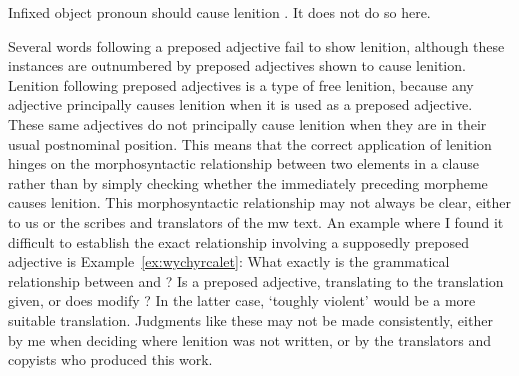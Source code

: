 Infixed object pronoun  should cause lenition . It does not do so here.

Several words following a preposed adjective fail to show lenition, although these instances are outnumbered by preposed adjectives shown to cause lenition.
Lenition following preposed adjectives is a type of free lenition, because any adjective principally causes lenition when it is used as a preposed adjective.
These same adjectives do not principally cause lenition when they are in their usual postnominal position.
This means that the correct application of lenition hinges on the morphosyntactic relationship between two elements in a clause rather than by simply checking whether the immediately preceding morpheme causes lenition.
This morphosyntactic relationship may not always be clear, either to us or the scribes and translators of the \gls{mw} text.
An example where I found it difficult to establish the exact relationship involving a supposedly preposed adjective is Example~\ref{ex:wychyrcalet}:
What exactly is the grammatical relationship between  and ?
Is  a preposed adjective, translating to the translation given, or does  modify ?
In the latter case, `toughly violent' would be a more suitable translation. 
Judgments like these may not be made consistently, either by me when deciding where lenition was not written, or by the translators and copyists who produced this work.

